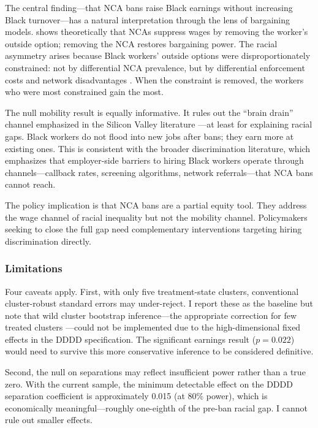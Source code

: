 \documentclass[12pt]{article}
\begin{document}
The central finding---that NCA bans raise Black earnings without increasing Black turnover---has a natural interpretation through the lens of bargaining models. \citet{shi2023noncompete} shows theoretically that NCAs suppress wages by removing the worker's outside option; removing the NCA restores bargaining power. The racial asymmetry arises because Black workers' outside options were disproportionately constrained: not by differential NCA prevalence, but by differential enforcement costs and network disadvantages \citep{butler2023racial}. When the constraint is removed, the workers who were most constrained gain the most.

The null mobility result is equally informative. It rules out the ``brain drain'' channel emphasized in the Silicon Valley literature \citep{gilson1999legal, marx2009mobility}---at least for explaining racial gaps. Black workers do not flood into new jobs after bans; they earn more at existing ones. This is consistent with the broader discrimination literature, which emphasizes that employer-side barriers to hiring Black workers \citep{bertrand2004emily, kline2022systemic, pager2009discrimination} operate through channels---callback rates, screening algorithms, network referrals---that NCA bans cannot reach.

The policy implication is that NCA bans are a partial equity tool. They address the wage channel of racial inequality but not the mobility channel. Policymakers seeking to close the full gap need complementary interventions targeting hiring discrimination directly.

\subsubsection*{Limitations} Four caveats apply. First, with only five treatment-state clusters, conventional cluster-robust standard errors may under-reject. I report these as the baseline but note that wild cluster bootstrap inference---the appropriate correction for few treated clusters \citep{cameron2008bootstrap, mackinnon2022wild}---could not be implemented due to the high-dimensional fixed effects in the DDDD specification. The significant earnings result ($p = 0.022$) would need to survive this more conservative inference to be considered definitive.

Second, the null on separations may reflect insufficient power rather than a true zero. With the current sample, the minimum detectable effect on the DDDD separation coefficient is approximately 0.015 (at 80\% power), which is economically meaningful---roughly one-eighth of the pre-ban racial gap. I cannot rule out smaller effects.
\end{document}

